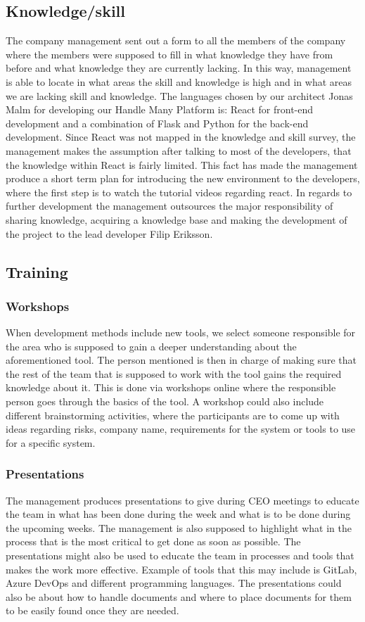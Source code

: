 \subsection{Knowledge/skill}
The company management sent out a form to all the members of the company where the members were supposed to fill in what knowledge they have from before and what knowledge they are currently lacking. In this way, management is able to locate in what areas the skill and knowledge is high and in what areas we are lacking skill and knowledge. The languages chosen by our architect Jonas Malm for developing our Handle Many Platform is: React for front-end development and a combination of Flask and Python for the back-end development. Since React was not mapped in the knowledge and skill survey, the management makes the assumption after talking to most of the developers, that the knowledge within React is fairly limited. This fact has made the management produce a short term plan for introducing the new environment to the developers, where the first step is to watch the tutorial videos regarding react. In regards to further development the management outsources the major responsibility of sharing knowledge, acquiring a knowledge base and making the development of the project to the lead developer Filip Eriksson. 

\subsection{Training}
\subsubsection{Workshops}
When development methods include new tools, we select someone responsible for the area who is supposed to gain a deeper understanding about the aforementioned tool. The person mentioned is then in charge of making sure that the rest of the team that is supposed to work with the tool gains the required knowledge about it. This is done via workshops online where the responsible person goes through the basics of the tool.  A workshop could also include different brainstorming activities, where the participants are to come up with ideas regarding risks, company name, requirements for the system or tools to use for a specific system. 

\subsubsection{Presentations}
The management produces presentations to give during CEO meetings to educate the team in what has been done during the week and what is to be done during the upcoming weeks. The management is also supposed to highlight what in the process that is the most critical to get done as soon as possible. The presentations might also be used to educate the team in processes and tools that makes the work more effective. Example of tools that this may include is GitLab, Azure DevOps and different programming languages. The presentations could also be about how to handle documents and where to place documents for them to be easily found once they are needed. 


